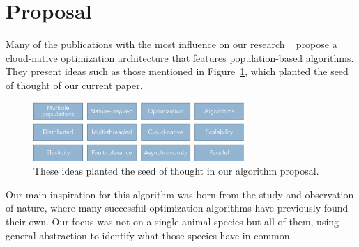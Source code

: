 \documentclass[graybox]{svmult}
\begin{document}

\section{Proposal}
\label{section.proposal}

Many of the publications with the most influence on our research
~\cite{valdez2021container,garcia2021event,merelo2016performance,merelo2016nodio}
propose a cloud-native optimization architecture that features population-based
algorithms. They present ideas such as those mentioned in Figure~\ref{fig.background},
which planted the seed of thought of our current paper.

\begin{figure}
    \centering
    \includegraphics[width=80mm]{img/fig1_background.pdf}
    \caption{These ideas planted the seed of thought in our algorithm proposal.} \label{fig.background}
    \end{figure}

Our main inspiration for this algorithm was born from the study and observation
of nature, where many successful optimization algorithms have previously found
their own. Our focus was not on a single animal species but all of them, using
general abstraction to identify what those species have in common. 
\end{document}
